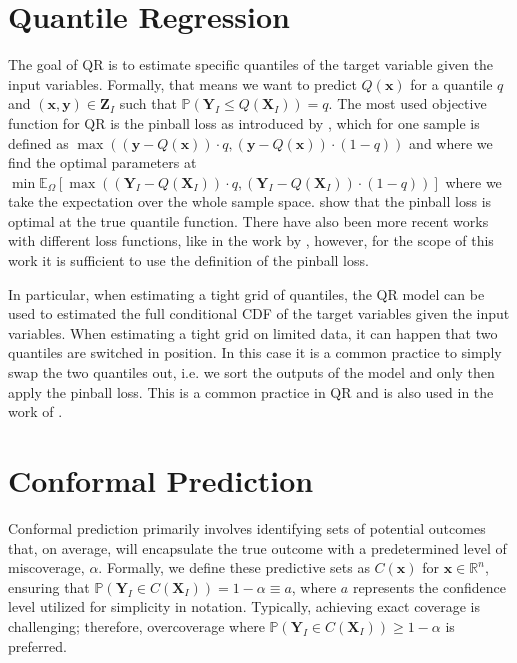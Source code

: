 \section{Quantile Regression}\label{sec:qr}

The goal of QR is to estimate specific quantiles of the target variable given the input variables. Formally, that means we want to predict $Q(\mathbf{x})$ for a quantile $q$ and $(\mathbf{x}, \mathbf{y})\in\mathbf{Z}_I$ such that $\mathbb{P}(\mathbf{Y}_I \leq Q(\mathbf{X}_I)) = q$. The most used objective function for QR is the pinball loss as introduced by \cite{koenker1978regression}, which for one sample is defined as $\max ((\mathbf{y} - Q(\mathbf{x})) \cdot q, (\mathbf{y} - Q(\mathbf{x})) \cdot (1 - q))$ and where we find the optimal parameters at $ \min \mathbb{E}_{\Omega}\left[ \max \left((\mathbf{Y}_I - Q(\mathbf{X}_I)) \cdot q, (\mathbf{Y}_I - Q(\mathbf{X}_I)) \cdot (1 - q)\right)\right]$ where we take the expectation over the whole sample space. \cite{koenker1978regression} show that the pinball loss is optimal at the true quantile function. There have also been more recent works with different loss functions, like in the work by \cite{chung2021beyond}, however, for the scope of this work it is sufficient to use the definition of the pinball loss.

In particular, when estimating a tight grid of quantiles, the QR model can be used to estimated the full conditional CDF of the target variables given the input variables. When estimating a tight grid on limited data, it can happen that two quantiles are switched in position. In this case it is a common practice to simply swap the two quantiles out, i.e. we sort the outputs of the model and only then apply the pinball loss. This is a common practice in QR and is also used in the work of \cite{sesia2021conformal}.

\section{Conformal Prediction}\label{sec:cp}

Conformal prediction primarily involves identifying sets of potential outcomes that, on average, will encapsulate the true outcome with a predetermined level of miscoverage, $\alpha$. Formally, we define these predictive sets as $C(\mathbf{x})$ for $\mathbf{x} \in \mathbb{R}^n$, ensuring that $\mathbb{P}(\mathbf{Y}_I \in C(\mathbf{X}_I)) = 1 - \alpha \equiv a$, where $a$ represents the confidence level utilized for simplicity in notation. Typically, achieving exact coverage is challenging; therefore, overcoverage where $\mathbb{P}(\mathbf{Y}_I \in C(\mathbf{X}_I)) \geq 1 - \alpha$ is preferred.

